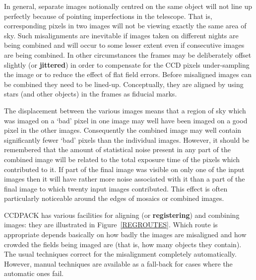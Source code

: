 \documentclass[twoside,11pt]{article}
\begin{document}
In general, separate images notionally centred on the same object will
not line up perfectly because of pointing imperfections in the telescope.
That is, corresponding pixels in two images will not be viewing exactly
the same area of sky.  Such misalignments are inevitable if images taken
on different nights are being combined and will occur to some lesser
extent even if consecutive images are being combined.  In other
circumstances the frames may be deliberately offset slightly (or {\bf
jittered}) in order to compensate for the CCD pixels under-sampling the
image or to reduce the effect of flat field errors.  Before misaligned
images can be combined they need to be lined-up.  Conceptually, they are
aligned by using stars (and other objects) in the frames as fiducial marks.

The displacement between the various images means that a region of sky
which was imaged on a `bad' pixel in one image may well have been imaged
on a good pixel in the other images.  Consequently the combined image may
well contain significantly fewer `bad' pixels than the individual images.
However, it should be remembered that the amount of statistical noise
present in any part of the combined image will be related to the
total exposure time of the pixels which contributed to it.  If part of the
final image was visible on only one of the input images then it will
have rather more noise associated with it than a part of the final image
to which twenty input images contributed.  This effect is often
particularly noticeable around the edges of mosaics or combined images.

CCDPACK has various facilities for aligning (or {\bf registering}) and
combining images: they are illustrated in Figure~\ref{REGROUTES}.  Which
route is appropriate depends basically on how badly the images are
misaligned and how crowded the fields being imaged are (that is, how
many objects they contain).  The usual techniques correct for the
misalignment completely automatically.  However, manual techniques are
available as a fall-back for cases where the automatic ones fail.
\end{document}
